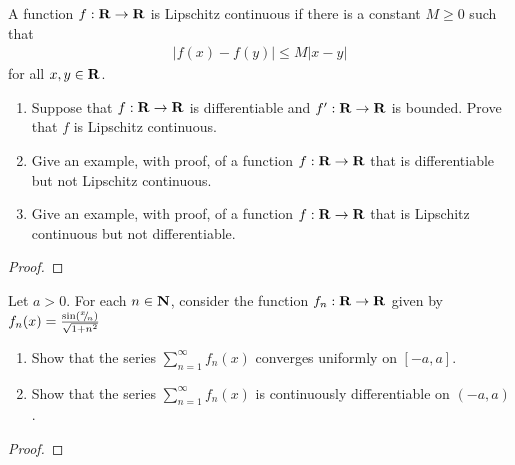 \documentclass[11pt,twoside,openany]{memoir}
\begin{document}
\newpage
\fancyhead[L]{\scalebox{0.9}{Derivatives and the Mean Value Theorem}}
\fancyhead[R]{\scalebox{0.9}{Appeared on: W22}}
\begin{problem}
    A function $f:\mathbf{R} \rightarrow \mathbf{R}$ is Lipschitz continuous if there is a constant $M \geq 0$ such that
        \begin{equation*}
        \begin{split}
            |f(x) - f(y)| \leq M|x-y|
        \end{split}
        \end{equation*}
    for all $x,y \in \mathbf{R}$.
    \begin{enumerate}[label = (\arabic*)]
        \item Suppose that $f:\mathbf{R} \rightarrow \mathbf{R}$ is differentiable and $f':\mathbf{R} \rightarrow \mathbf{R}$ is bounded. Prove that $f$ is Lipschitz continuous.
        \item Give an example, with proof, of a function $f:\mathbf{R} \rightarrow \mathbf{R}$ that is differentiable but not Lipschitz continuous.
        \item Give an example, with proof, of a function $f:\mathbf{R} \rightarrow \mathbf{R}$ that is Lipschitz continuous but not differentiable.
    \end{enumerate}
\end{problem}
\begin{proof}
\end{proof}

\newpage
\fancyhead[L]{\scalebox{0.9}{Series of Functions}}
\fancyhead[R]{\scalebox{0.9}{Appeared on: S15}}
\begin{problem}
    Let $a > 0$. For each $n \in \mathbf{N}$, consider the function $f_n:\mathbf{R} \rightarrow \mathbf{R}$ given by $f_n(x) = \frac{\sin \left( {}^{x}\mskip -5mu/\mskip -3mu_{n} \right)}{\sqrt{1 + n^2}}$
        \begin{enumerate}[label = (\arabic*)]
            \item Show that the series $\sum_{n = 1}^\infty f_n(x)$ converges uniformly on $[-a,a]$.
            \item Show that the series $\sum_{n = 1}^\infty f_n(x)$ is continuously differentiable on $(-a,a)$.
        \end{enumerate}
\end{problem}
\begin{proof}
\end{proof}
\end{document}
